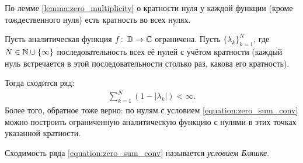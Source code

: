 \documentclass[../../main.tex]{subfiles}
\begin{document}
По лемме \eqref{lemma:zero_multiplicity} о кратности нуля у каждой функции (кроме тождественного нуля) есть кратность во всех нулях.

\begin{thm}
 Пусть аналитическая функция $ f\colon\,\mathbb D \to \mathbb{C} $  ограничена. Пусть $\{\lambda_{k}\}_{k=1}^{N} $,  где $ N \in \mathbb{N} \cup \left\{ \infty \right\} $ последовательность всех её нулей с учётом кратности (каждый нуль встречается в этой последовательности столько раз, какова его кратность).

 Тогда сходится ряд:
 \begin{align}
  \label{equation:zero_sum_conv}
  \sum_{k=1}^{N} \left( 1 - \left| \lambda_k \right| \right) < \infty.
 \end{align} Более того, обратное тоже верно: по нулям с условием \eqref{equation:zero_sum_conv} можно построить ограниченную аналитическую функцию с нулями в этих точках указанной кратности.
\end{thm}
Сходимость ряда \eqref{equation:zero_sum_conv} называется \textit{условием Бляшке}.
\end{document}
